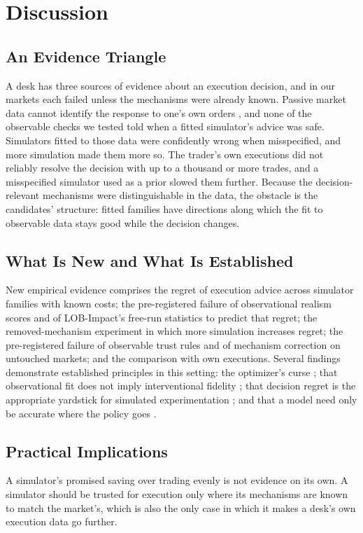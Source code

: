 \documentclass{ieeeaccess}
\begin{document}
\section{Discussion}
\label{sec:discussion}

\subsection{An Evidence Triangle}
A desk has three sources of evidence about an execution decision, and in our markets each failed unless the mechanisms
were already known. Passive market data cannot identify the response to one's own orders
\cite{naviglio2026metaorder,fujiwara2026decay}, and none of the observable checks we tested told when a fitted
simulator's advice was safe. Simulators fitted to those data were confidently wrong when misspecified, and more
simulation made them more so. The trader's own executions did not reliably resolve the decision with up to a thousand or
more trades, and a misspecified simulator used as a prior slowed them further. Because the decision-relevant mechanisms
were distinguishable in the data, the obstacle is the candidates' structure: fitted families have directions along which
the fit to observable data stays good while the decision changes.

\subsection{What Is New and What Is Established}
New empirical evidence comprises the regret of execution advice across simulator families with known costs; the
pre-registered failure of observational realism scores and of LOB-Impact's free-run statistics to predict that regret;
the removed-mechanism experiment in which more simulation increases regret; the pre-registered failure of observable
trust rules and of mechanism correction on untouched markets; and the comparison with own executions. Several findings
demonstrate established principles in this setting: the optimizer's curse \cite{smith2006optimizer}; that observational
fit does not imply interventional fidelity \cite{nigmatulin2026lobimpact,naviglio2026metaorder}; that decision regret is
the appropriate yardstick for simulated experimentation \cite{lu2026crashgym}; and that a model need only be accurate
where the policy goes \cite{dong2023local,dann2026policyaware}.

\subsection{Practical Implications}
A simulator's promised saving over trading evenly is not evidence on its own. A simulator should be trusted for execution
only where its mechanisms are known to match the market's, which is also the only case in which it makes a desk's own
execution data go further.
\end{document}
